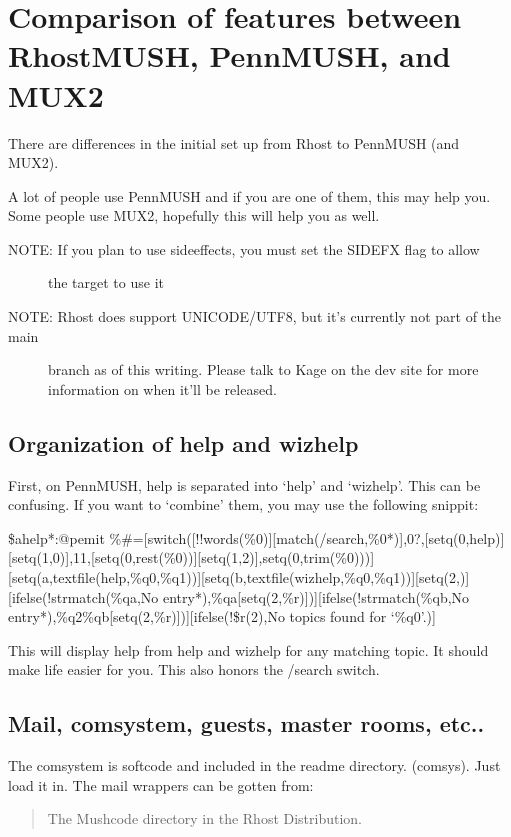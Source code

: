 \documentclass[letterpaper,10pt,english]{sphinxmanual}
\begin{document}
\chapter{Comparison of features between RhostMUSH, PennMUSH, and MUX2}
\label{\detokenize{31-comparison:comparison-of-features-between-rhostmush-pennmush-and-mux2}}\label{\detokenize{31-comparison::doc}}
\sphinxAtStartPar
There are differences in the initial set up from Rhost to PennMUSH (and MUX2).

\sphinxAtStartPar
A lot of people use PennMUSH and if you are one of them, this may help you.
Some people use MUX2, hopefully this will help you as well.
\begin{description}
\item[{NOTE:  If you plan to use sideeffects, you must set the SIDEFX flag to allow}] \leavevmode
\sphinxAtStartPar
the target to use it

\item[{NOTE:  Rhost does support UNICODE/UTF8, but it’s currently not part of the main}] \leavevmode
\sphinxAtStartPar
branch as of this writing.  Please talk to Kage on the dev site for more
information on when it’ll be released.

\end{description}


\section{Organization of help and wizhelp}
\label{\detokenize{31-comparison:organization-of-help-and-wizhelp}}
\sphinxAtStartPar
First, on PennMUSH, help is separated into ‘help’ and ‘wizhelp’.  This can
be confusing. If you want to ‘combine’ them, you may use the following snippit:

\sphinxAtStartPar
\$ahelp*:@pemit \%\#={[}switch({[}!!words(\%0){]}{[}match(/search,\%0*){]},0?,{[}setq(0,help){]}{[}setq(1,0){]},11,{[}setq(0,rest(\%0)){]}{[}setq(1,2){]},setq(0,trim(\%0))){]}{[}setq(a,textfile(help,\%q0,\%q1)){]}{[}setq(b,textfile(wizhelp,\%q0,\%q1)){]}{[}setq(2,){]}{[}ifelse(!strmatch(\%qa,No entry*),\%qa{[}setq(2,\%r){]}){]}{[}ifelse(!strmatch(\%qb,No entry*),\%q2\%qb{[}setq(2,\%r){]}){]}{[}ifelse(!\$r(2),No topics found for ‘\%q0’.){]}

\sphinxAtStartPar
This will display help from help and wizhelp for any matching topic.  It
should make life easier for you.  This also honors the /search switch.


\section{Mail, comsystem, guests, master rooms, etc..}
\label{\detokenize{31-comparison:mail-comsystem-guests-master-rooms-etc}}
\sphinxAtStartPar
The comsystem is softcode and included in the readme directory. (comsys).
Just load it in.  The mail wrappers can be gotten from:
\begin{quote}

\sphinxAtStartPar
The Mushcode directory in the Rhost Distribution.
\end{quote}
\end{document}
